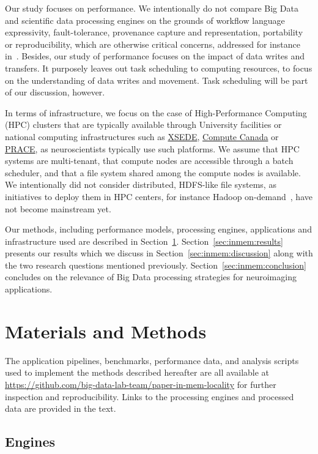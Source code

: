 Our study focuses on performance. We intentionally do not compare Big Data and
scientific data processing engines on the grounds of workflow language
expressivity, fault-tolerance, provenance capture and representation,
portability or reproducibility, which are otherwise critical concerns, addressed
for instance in~\cite{samba}. Besides, our study of performance focuses on the
impact of data writes and transfers. It purposely leaves out task scheduling to
computing resources, to focus on the understanding of data writes and movement.
Task scheduling will be part of our discussion, however.

In terms of infrastructure, we focus on the case of High-Performance Computing
(HPC) clusters that are typically available through University facilities or
national computing infrastructures such as \href{xsede.org}{XSEDE},
\href{http://computecanada.ca}{Compute Canada} or
\href{http://www.prace-ri.eu}{PRACE}, as neuroscientists typically use such
platforms. We assume that HPC systems are multi-tenant, that compute nodes are
accessible through a batch scheduler, and that a file system shared among the
compute nodes is available. We intentionally did not consider distributed,
HDFS-like file systems, as initiatives to deploy them in HPC centers, for
instance Hadoop on-demand~\cite{krishnan2011myhadoop}, have not become
mainstream yet.

Our methods, including performance models, processing engines, applications and
infrastructure used are described in Section~\ref{sec:inmem:methods}.
Section~\ref{sec:inmem:results} presents our results which we discuss in
Section~\ref{sec:inmem:discussion} along with the two research questions mentioned
previously. Section~\ref{sec:inmem:conclusion} concludes on the relevance of Big Data
processing strategies for neuroimaging applications.

\section{Materials and Methods} %
\label{sec:inmem:methods}

The application pipelines, benchmarks, performance data, and analysis scripts
used to implement the methods described hereafter are all available at
\url{https://github.com/big-data-lab-team/paper-in-mem-locality} for further
inspection and reproducibility. Links to the processing engines and processed
data are provided in the text.

\subsection{Engines} %

